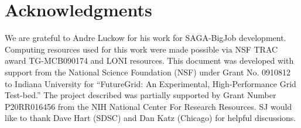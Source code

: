 \documentclass{sig-alternate}
\begin{document}
\section{Acknowledgments}
We are grateful to Andre Luckow for his work for SAGA-BigJob development.  Computing resources used for this
work were made possible via NSF TRAC award TG-MCB090174 and LONI
resources.  This document was developed with support from the National
Science Foundation (NSF) under Grant No.  0910812 to Indiana
University for ``FutureGrid: An Experimental, High-Performance Grid
Test-bed.'' The project described was partially supported by Grant
Number P20RR016456 from the NIH National Center For Research
Resources. SJ would like to thank Dave Hart (SDSC) and Dan Katz
(Chicago) for helpful discussions.



\end{document}

